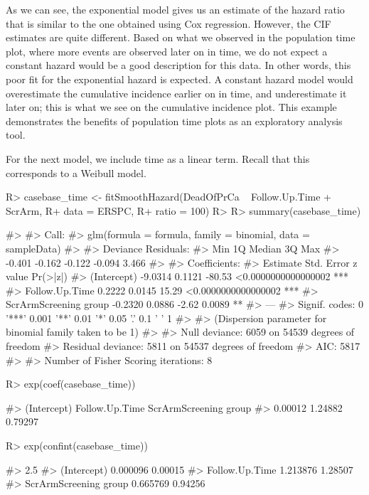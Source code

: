 \documentclass[
]{jss}
\begin{document}
As we can see, the exponential model gives us an estimate of the hazard
ratio that is similar to the one obtained using Cox regression. However,
the CIF estimates are quite different. Based on what we observed in the
population time plot, where more events are observed later on in time,
we do not expect a constant hazard would be a good description for this
data. In other words, this poor fit for the exponential hazard is
expected. A constant hazard model would overestimate the cumulative
incidence earlier on in time, and underestimate it later on; this is
what we see on the cumulative incidence plot. This example demonstrates
the benefits of population time plots as an exploratory analysis tool.

For the next model, we include time as a linear term. Recall that this
corresponds to a Weibull model.

\begin{CodeChunk}

\begin{CodeInput}
R> casebase_time <- fitSmoothHazard(DeadOfPrCa ~ Follow.Up.Time + ScrArm, 
R+                                  data = ERSPC, 
R+                                  ratio = 100)
R> 
R> summary(casebase_time)
\end{CodeInput}

\begin{CodeOutput}
#> 
#> Call:
#> glm(formula = formula, family = binomial, data = sampleData)
#> 
#> Deviance Residuals: 
#>    Min      1Q  Median      3Q     Max  
#> -0.401  -0.162  -0.122  -0.094   3.466  
#> 
#> Coefficients:
#>                       Estimate Std. Error z value            Pr(>|z|)    
#> (Intercept)            -9.0314     0.1121  -80.53 <0.0000000000000002 ***
#> Follow.Up.Time          0.2222     0.0145   15.29 <0.0000000000000002 ***
#> ScrArmScreening group  -0.2320     0.0886   -2.62              0.0089 ** 
#> ---
#> Signif. codes:  0 '***' 0.001 '**' 0.01 '*' 0.05 '.' 0.1 ' ' 1
#> 
#> (Dispersion parameter for binomial family taken to be 1)
#> 
#>     Null deviance: 6059  on 54539  degrees of freedom
#> Residual deviance: 5811  on 54537  degrees of freedom
#> AIC: 5817
#> 
#> Number of Fisher Scoring iterations: 8
\end{CodeOutput}

\begin{CodeInput}
R> exp(coef(casebase_time))
\end{CodeInput}

\begin{CodeOutput}
#>           (Intercept)        Follow.Up.Time ScrArmScreening group 
#>               0.00012               1.24882               0.79297
\end{CodeOutput}

\begin{CodeInput}
R> exp(confint(casebase_time))
\end{CodeInput}

\begin{CodeOutput}
#>                          2.5 %
#> (Intercept)           0.000096 0.00015
#> Follow.Up.Time        1.213876 1.28507
#> ScrArmScreening group 0.665769 0.94256
\end{CodeOutput}
\end{CodeChunk}
\end{document}
